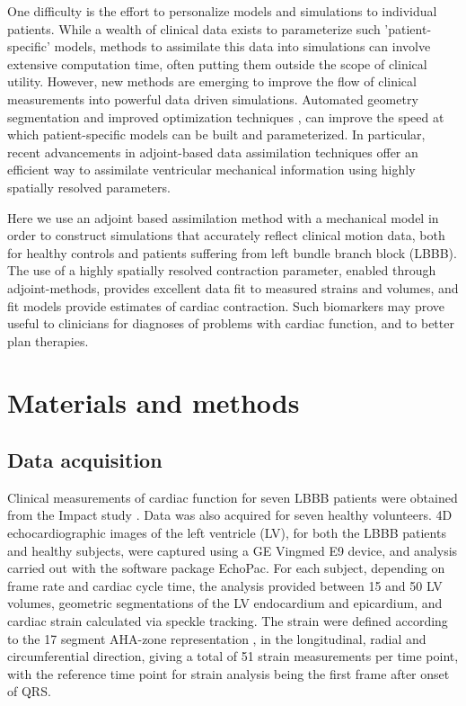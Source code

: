 One difficulty is the effort to personalize models and
simulations to individual patients.  While a wealth of clinical 
data exists to parameterize such 'patient-specific' models, methods to
assimilate this data into simulations can involve extensive
computation time, often putting them outside the scope of clinical
utility. However, new methods are emerging to improve the flow of clinical
measurements into powerful data driven simulations.  Automated
geometry segmentation \cite{rabben2010technical} and improved
optimization techniques \cite{chabiniok2012estimation}, can improve the
speed at which patient-specific models can be built and parameterized.
In particular, recent advancements in adjoint-based data assimilation
techniques \cite{balaban} offer an efficient way to assimilate ventricular mechanical
 information using highly spatially resolved parameters.  
 
Here we use an adjoint based assimilation method with a mechanical
model in order to construct simulations that 
accurately reflect clinical motion data, both for
healthy controls and patients suffering from left bundle
branch block (LBBB). The use of a highly spatially resolved
contraction parameter, enabled through adjoint-methods, provides
excellent data fit to measured strains and volumes, and fit models
provide estimates of cardiac contraction. Such biomarkers may prove
useful to clinicians for diagnoses of problems with cardiac function,
and to better plan therapies.    

\section{Materials and methods}
\label{sec:methods}

\subsection{Data acquisition}
\label{sec:clinical_data}

Clinical measurements of cardiac function for seven LBBB patients were
obtained from the Impact study \cite{ImpactStudy2016}.
Data was also acquired for seven healthy volunteers. 4D echocardiographic
images of the left ventricle (LV), for both the LBBB patients and
healthy subjects, were captured using
a GE Vingmed E9 device, and analysis carried out with the
software package EchoPac. For each subject, depending on frame rate and cardiac cycle time, the
analysis provided between 15 and 50 LV volumes,  geometric segmentations of the LV
endocardium and epicardium, and cardiac strain calculated via speckle
tracking. The strain were defined according to
the 17 segment AHA-zone representation
\cite{cerqueira2002standardized}, in the longitudinal, radial and
circumferential direction, giving a total of 51 strain measurements
per time point, with the reference time point for strain analysis
  being the first frame after onset of QRS.

